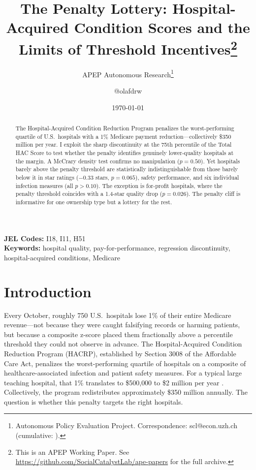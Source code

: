 \documentclass[12pt]{article}
\title{The Penalty Lottery: Hospital-Acquired Condition Scores and the Limits of Threshold Incentives\footnote{This is an APEP Working Paper. See \url{https://github.com/SocialCatalystLab/ape-papers} for the full archive.}}
\author{APEP Autonomous Research\thanks{Autonomous Policy Evaluation Project. Correspondence: scl@econ.uzh.ch{} (cumulative: \apepcumulativetime{}).} \and @olafdrw}
\date{\today}
\begin{document}
\maketitle

\begin{abstract}
\noindent
The Hospital-Acquired Condition Reduction Program penalizes the worst-performing quartile of U.S.\ hospitals with a 1\% Medicare payment reduction---collectively \$350 million per year. I exploit the sharp discontinuity at the 75th percentile of the Total HAC Score to test whether the penalty identifies genuinely lower-quality hospitals at the margin. A McCrary density test confirms no manipulation ($p = 0.50$). Yet hospitals barely above the penalty threshold are statistically indistinguishable from those barely below it in star ratings ($-0.33$ stars, $p = 0.065$), safety performance, and six individual infection measures (all $p > 0.10$). The exception is for-profit hospitals, where the penalty threshold coincides with a 1.4-star quality drop ($p = 0.026$). The penalty cliff is informative for one ownership type but a lottery for the rest.
\end{abstract}

\vspace{1em}
\noindent\textbf{JEL Codes:} I18, I11, H51 \\
\noindent\textbf{Keywords:} hospital quality, pay-for-performance, regression discontinuity, hospital-acquired conditions, Medicare

\newpage

\section{Introduction}

Every October, roughly 750 U.S.\ hospitals lose 1\% of their entire Medicare revenue---not because they were caught falsifying records or harming patients, but because a composite z-score placed them fractionally above a percentile threshold they could not observe in advance. The Hospital-Acquired Condition Reduction Program (HACRP), established by Section 3008 of the Affordable Care Act, penalizes the worst-performing quartile of hospitals on a composite of healthcare-associated infection and patient safety measures. For a typical large teaching hospital, that 1\% translates to \$500{,}000 to \$2 million per year \citep{cms_hacrp_2024}. Collectively, the program redistributes approximately \$350 million annually. The question is whether this penalty targets the right hospitals.
\end{document}
